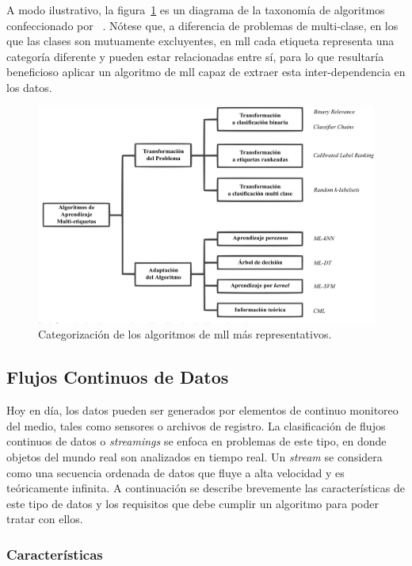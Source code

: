 A modo ilustrativo, la figura~\ref{fig:algorithm_taxonomy} es un diagrama de la
taxonomía de algoritmos confeccionado por
\citeauthor{zhang_review_2014}~\cite{zhang_review_2014}. Nótese que, a
diferencia de problemas de multi-clase, en los que las clases son mutuamente
excluyentes, en \acrshort{mll} cada etiqueta representa una categoría diferente
y pueden estar relacionadas entre sí, para lo que resultaría beneficioso aplicar
un algoritmo de \acrshort{mll} capaz de extraer esta inter-dependencia en los
datos.

\begin{figure}
	\includegraphics[width=\linewidth]{figures/algorithm_taxonomy.png}
	\caption{Categorización de los algoritmos de \acrshort{mll} más representativos.}
	\label{fig:algorithm_taxonomy}
\end{figure}

\subsection{Flujos Continuos de Datos}
\label{intro_streams}

Hoy en día, los datos pueden ser generados por elementos de continuo monitoreo
del medio, tales como sensores o archivos de registro.  La clasificación de
flujos continuos de datos o \textit{streamings} se enfoca en problemas de este
tipo, en donde objetos del mundo real son analizados en tiempo real. Un
\textit{stream} se considera como una secuencia ordenada de datos que fluye a
alta velocidad y es teóricamente infinita. A continuación se describe brevemente
las características de este tipo de datos y los requisitos que debe cumplir un
algoritmo para poder tratar con ellos.

\subsubsection{Características}
\label{stream_caracteristicas}

